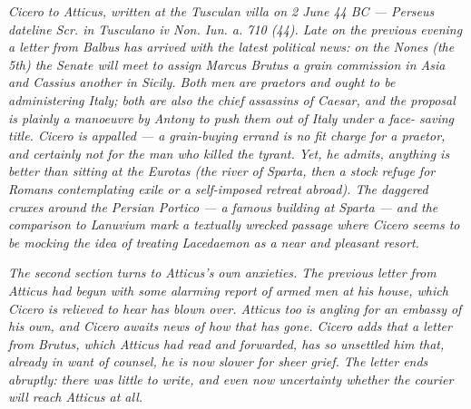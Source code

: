 
\textit{Cicero to Atticus, written at the Tusculan villa on 2
June 44 BC --- Perseus dateline \textit{Scr. in Tusculano iv
Non. Iun. a. 710 (44)}. Late on the previous evening a letter
from Balbus has arrived with the latest political news: on the
Nones (the 5th) the Senate will meet to assign Marcus Brutus a
grain commission in Asia and Cassius another in Sicily. Both
men are praetors and ought to be administering Italy; both are
also the chief assassins of Caesar, and the proposal is plainly
a manoeuvre by Antony to push them out of Italy under a face-
saving title. Cicero is appalled --- a grain-buying errand is
no fit charge for a praetor, and certainly not for the man who
killed the tyrant. Yet, he admits, anything is better than
sitting at the Eurotas (the river of Sparta, then a stock
refuge for Romans contemplating exile or a self-imposed retreat
abroad). The daggered cruxes around the Persian Portico --- a
famous building at Sparta --- and the comparison to Lanuvium
mark a textually wrecked passage where Cicero seems to be
mocking the idea of treating Lacedaemon as a near and pleasant
resort.}

\textit{The second section turns to Atticus's own anxieties.
The previous letter from Atticus had begun with some alarming
report of armed men at his house, which Cicero is relieved to
hear has blown over. Atticus too is angling for an embassy of
his own, and Cicero awaits news of how that has gone. Cicero
adds that a letter from Brutus, which Atticus had read and
forwarded, has so unsettled him that, already in want of
counsel, he is now slower for sheer grief. The letter ends
abruptly: there was little to write, and even now uncertainty
whether the courier will reach Atticus at all.}
